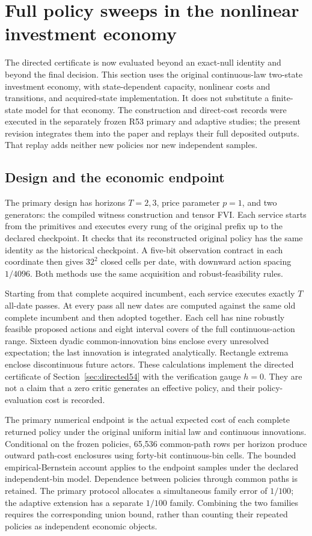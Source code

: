 \section{Full policy sweeps in the nonlinear investment economy}\label{sec:study54}
The directed certificate is now evaluated beyond an exact-null identity and beyond the final decision. This section uses the original continuous-law two-state investment economy, with state-dependent capacity, nonlinear costs and transitions, and acquired-state implementation. It does not substitute a finite-state model for that economy. The construction and direct-cost records were executed in the separately frozen R53 primary and adaptive studies; the present revision integrates them into the paper and replays their full deposited outputs. That replay adds neither new policies nor new independent samples.

\subsection{Design and the economic endpoint}
The primary design has horizons $T=2,3$, price parameter $p=1$, and two generators: the compiled witness construction and tensor FVI. Each service starts from the primitives and executes every rung of the original prefix up to the declared checkpoint. It checks that its reconstructed original policy has the same identity as the historical checkpoint. A five-bit observation contract in each coordinate then gives $32^2$ closed cells per date, with downward action spacing $1/4096$. Both methods use the same acquisition and robust-feasibility rules.

Starting from that complete acquired incumbent, each service executes exactly $T$ all-date passes. At every pass all new dates are computed against the same old complete incumbent and then adopted together. Each cell has nine robustly feasible proposed actions and eight interval covers of the full continuous-action range. Sixteen dyadic common-innovation bins enclose every unresolved expectation; the last innovation is integrated analytically. Rectangle extrema enclose discontinuous future actors. These calculations implement the directed certificate of Section~\ref{sec:directed54} with the verification gauge $h=0$. They are not a claim that a zero critic generates an effective policy, and their policy-evaluation cost is recorded.

The primary numerical endpoint is the actual expected cost of each complete returned policy under the original uniform initial law and continuous innovations. Conditional on the frozen policies, 65,536 common-path rows per horizon produce outward path-cost enclosures using forty-bit continuous-bin cells. The bounded empirical-Bernstein account applies to the endpoint samples under the declared independent-bin model. Dependence between policies through common paths is retained. The primary protocol allocates a simultaneous family error of $1/100$; the adaptive extension has a separate $1/100$ family. Combining the two families requires the corresponding union bound, rather than counting their repeated policies as independent economic objects.

